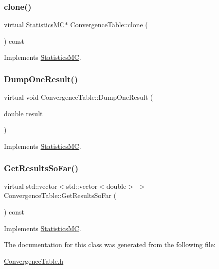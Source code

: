 \subsubsection{\texorpdfstring{clone()}{clone()}}
{\footnotesize\ttfamily virtual \hyperlink{classStatisticsMC}{Statistics\+MC}$\ast$ Convergence\+Table\+::clone (\begin{DoxyParamCaption}{ }\end{DoxyParamCaption}) const\hspace{0.3cm}{\ttfamily [virtual]}}



Implements \hyperlink{classStatisticsMC_af716d17e088d36f283e112ba736f8002}{Statistics\+MC}.

\hypertarget{classConvergenceTable_ae4ebb3988c6a8bc4e81049bfacf388e2}{}\label{classConvergenceTable_ae4ebb3988c6a8bc4e81049bfacf388e2} 
\subsubsection{\texorpdfstring{Dump\+One\+Result()}{DumpOneResult()}}
{\footnotesize\ttfamily virtual void Convergence\+Table\+::\+Dump\+One\+Result (\begin{DoxyParamCaption}\item[{double}]{result }\end{DoxyParamCaption})\hspace{0.3cm}{\ttfamily [virtual]}}



Implements \hyperlink{classStatisticsMC_a3ab5fb27d6933d8e35b2a55c3897cbe3}{Statistics\+MC}.

\hypertarget{classConvergenceTable_a74d6d80fbfb1af7cd27ab306f0f619c0}{}\label{classConvergenceTable_a74d6d80fbfb1af7cd27ab306f0f619c0} 
\subsubsection{\texorpdfstring{Get\+Results\+So\+Far()}{GetResultsSoFar()}}
{\footnotesize\ttfamily virtual std\+::vector$<$std\+::vector$<$double$>$ $>$ Convergence\+Table\+::\+Get\+Results\+So\+Far (\begin{DoxyParamCaption}{ }\end{DoxyParamCaption}) const\hspace{0.3cm}{\ttfamily [virtual]}}



Implements \hyperlink{classStatisticsMC_ae29a294b6db36c2bf46c20ac30e25aad}{Statistics\+MC}.



The documentation for this class was generated from the following file\+:\begin{DoxyCompactItemize}
\item 
\hyperlink{ConvergenceTable_8h}{Convergence\+Table.\+h}\end{DoxyCompactItemize}
